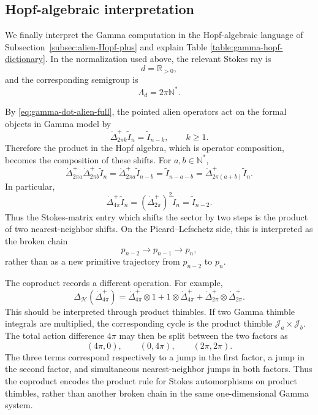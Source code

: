 \documentclass[11pt]{amsart}
\theoremstyle{plain}
\newcommand{\J}{\mathcal J}
\begin{document}
\smallskip
\subsection{Hopf-algebraic interpretation}
\label{subsec:gamma-Hopf-interpretation}

We finally interpret the Gamma computation in the Hopf-algebraic language of
Subsection~\ref{subsec:alien-Hopf-plus} and explain Table \ref{table:gamma-hopf-dictionary}.  In the normalization used above, the
relevant Stokes ray is
\[
d=\mathbb R_{>0},
\]
and the corresponding semigroup is
\[
\Lambda_d=2\pi\mathbb N^\ast.
\]

By \eqref{eq:gamma-dot-alien-full}, the pointed alien operators act on the
formal objects in Gamma model by
\begin{equation}\label{eq:gamma-dotDelta-plus-shift-Hopf}
\dot\Delta_{2\pi k}^{+}\widetilde I_n
=
\widetilde I_{n-k},
\qquad k\ge1.
\end{equation}
Therefore the product in the Hopf algebra, which is operator composition,
becomes the composition of these shifts.  For \(a,b\in\mathbb N^\ast\),
\[
\dot\Delta_{2\pi a}^{+}\dot\Delta_{2\pi b}^{+}\widetilde I_n
=
\dot\Delta_{2\pi a}^{+}\widetilde I_{n-b}
=
\widetilde I_{n-a-b}
=
\dot\Delta_{2\pi(a+b)}^{+}\widetilde I_n.
\]
In particular,
\[
\dot\Delta_{4\pi}^{+}\widetilde I_n
=
(\dot\Delta_{2\pi}^{+})^2\widetilde I_n
=
\widetilde I_{n-2}.
\]
Thus the Stokes-matrix entry which shifts the sector by two steps is the
product of two nearest-neighbor shifts. On the Picard--Lefschetz
side, this is interpreted as the broken chain
\[
p_{n-2}\longrightarrow p_{n-1}\longrightarrow p_n,
\]
rather than as a new primitive trajectory from \(p_{n-2}\) to \(p_n\).





The coproduct records a different operation.  For example,
\[
\Delta_{\mathcal H}(\dot\Delta_{4\pi}^{+})
=
\dot\Delta_{4\pi}^{+}\otimes1
+
1\otimes\dot\Delta_{4\pi}^{+}
+
\dot\Delta_{2\pi}^{+}\otimes\dot\Delta_{2\pi}^{+}.
\]
This should be interpreted through product thimbles.  If two Gamma thimble
integrals are multiplied, the corresponding cycle is the product thimble
\(\J_a\times \J_b\).  The total action difference \(4\pi\) may then be split
between the two factors as
\[
(4\pi,0),\qquad (0,4\pi),\qquad (2\pi,2\pi).
\]
The three terms correspond respectively to a jump in the first factor, a
jump in the second factor, and simultaneous nearest-neighbor jumps in both
factors.  Thus the coproduct encodes the product rule for Stokes
automorphisms on product thimbles, rather than another broken chain in the
same one-dimensional Gamma system.
\end{document}
